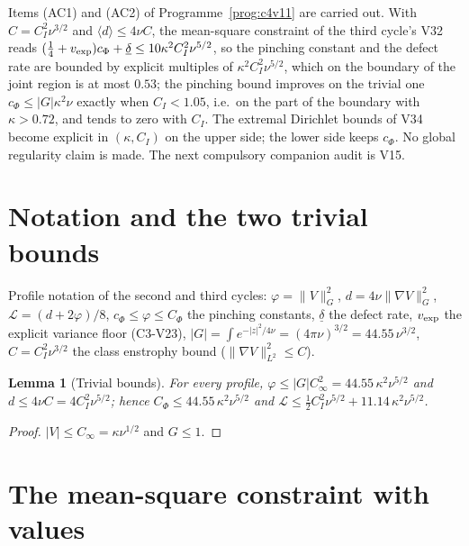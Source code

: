 \documentclass[11pt]{article}
\theoremstyle{plain}
\newtheorem{lemma}[theorem]{Lemma}
\theoremstyle{definition}
\theoremstyle{remark}
\begin{document}
Items (AC1) and (AC2) of Programme~\ref{prog:c4v11} are carried out.
With \(C=C_I^2\nu^{3/2}\) and \(\langle d\rangle\le4\nu C\), the mean-square constraint of the
third cycle's V32 reads \((\frac14+v_{\rm exp})c_\Phi+\underline\delta\le10\kappa^2C_I^2\nu^{5/2}\), so the
pinching constant and the defect rate are bounded by explicit
multiples of \(\kappa^2C_I^2\nu^{5/2}\), which on the boundary of the joint region
is at most \(0.53\); the pinching bound improves on the trivial one
\(c_\Phi\le|G|\kappa^2\nu\) exactly when \(C_I<1.05\), i.e.\ on the part of the boundary
with \(\kappa>0.72\), and tends to zero with \(C_I\).  The extremal Dirichlet
bounds of V34 become explicit in \((\kappa,C_I)\) on the upper side; the lower
side keeps \(c_\Phi\).  No global regularity claim is made.  The next
compulsory companion audit is V15.

\section{Notation and the two trivial bounds}
\label{sec:c4v11-notation}

Profile notation of the second and third cycles: \(\varphi=\|V\|_G^2\), \(d=4\nu\|\nabla V\|_G^2\),
\(\mathcal L=(d+2\varphi)/8\), \(c_\Phi\le\varphi\le C_\Phi\) the pinching constants, \(\underline\delta\) the defect rate,
\(v_{\rm exp}\) the explicit variance floor (C3-V23), \(|G|=\int e^{-|z|^2/4\nu}=(4\pi\nu)^{3/2}=44.55\,\nu^{3/2}\),
\(C=C_I^2\nu^{3/2}\) the class enstrophy bound (\(\|\nabla V\|_{L^2}^2\le C\)).

\begin{lemma}[Trivial bounds]
\label{lem:c4v11-trivial}
For every profile, \(\varphi\le|G|C_\infty^2=44.55\,\kappa^2\nu^{5/2}\) and \(d\le4\nu C=4C_I^2\nu^{5/2}\); hence
\(C_\Phi\le44.55\,\kappa^2\nu^{5/2}\) and \(\mathcal L\le\frac12C_I^2\nu^{5/2}+11.14\,\kappa^2\nu^{5/2}\).
\end{lemma}

\begin{proof}
\(|V|\le C_\infty=\kappa\nu^{1/2}\) and \(G\le1\).
\end{proof}

\section{The mean-square constraint with values}
\label{sec:c4v11-constraint}
\end{document}
